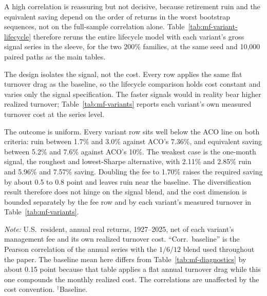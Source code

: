 \documentclass[11pt]{article}
\begin{document}
A high correlation is reassuring but not decisive, because retirement ruin and
the equivalent saving depend on the order of returns in the worst bootstrap
sequences, not on the full-sample correlation alone. Table~\ref{tab:mf-variant-lifecycle}
therefore reruns the entire lifecycle model with each variant's gross signal
series in the sleeve, for the two 200\% families, at the same seed and 10,000
paired paths as the main tables.

The design isolates the signal, not the cost. Every row applies the same flat
turnover drag as the baseline, so the lifecycle comparison holds cost constant
and varies only the signal specification. The faster signals would in reality
bear higher realized turnover; Table~\ref{tab:mf-variants} reports each
variant's own measured turnover cost at the series level.

The outcome is uniform. Every variant row sits well below the ACO line on both
criteria: ruin between 1.7\% and 3.0\% against ACO's 7.36\%, and
equivalent saving between 5.2\% and 7.6\% against ACO's 10\%. The
weakest case is the one-month signal, the roughest and lowest-Sharpe
alternative, with 2.11\% and 2.85\% ruin and 5.96\% and 7.57\% saving.
Doubling the fee to 1.70\% raises the required saving by about 0.5 to
0.8 point and leaves ruin near the baseline. The diversification result
therefore does not hinge on the signal blend, and the cost dimension is
bounded separately by the fee row and by each variant's measured turnover in
Table~\ref{tab:mf-variants}.

\begin{table}[H]
\centering
\caption{Managed-futures proxy under alternative construction choices}
\label{tab:mf-variants}
\small

\begin{minipage}{0.94\textwidth}\footnotesize
\textit{Note:} U.S.\ resident, annual real returns, 1927--2025, net of each
variant's management fee and its own realized turnover cost. ``Corr.\
baseline'' is the Pearson correlation of the annual series with the
$1/6/12$ blend used throughout the paper. The baseline mean here differs from
Table~\ref{tab:mf-diagnostics} by about 0.15 point because that table applies
a flat annual turnover drag while this one compounds the monthly realized cost.
The correlations are unaffected by the cost convention. $^{\dagger}$Baseline.
\end{minipage}
\end{table}
\end{document}
